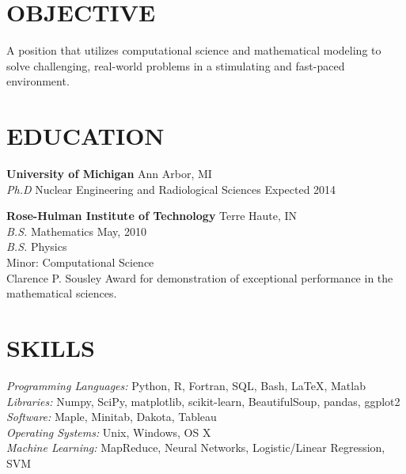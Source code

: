 \documentclass[margin, 10pt]{res} %
\begin{document}
\begin{resume}

 
\section{OBJECTIVE}  

A position that utilizes computational science and mathematical modeling to solve challenging, real-world problems in a stimulating and fast-paced environment.    


\section{EDUCATION}

\textbf{University of Michigan} \hfill Ann Arbor, MI \\
{\sl Ph.D} Nuclear Engineering and Radiological Sciences \hfill Expected 2014

\textbf{Rose-Hulman Institute of Technology} \hfill Terre Haute, IN \\
{\sl B.S.} Mathematics \hfill May, 2010 \\
{\sl B.S.} Physics \\
Minor: Computational Science \\
Clarence P. Sousley Award for demonstration of exceptional performance in the mathematical sciences.
 

\section{SKILLS} 

{\sl Programming Languages:} Python, R, Fortran, SQL, Bash, \LaTeX, Matlab \\
{\sl Libraries:} Numpy, SciPy, matplotlib, scikit-learn, BeautifulSoup, pandas, ggplot2 \\
{\sl Software:} Maple, Minitab, Dakota, Tableau \\
{\sl Operating Systems:} Unix, Windows, OS X \\
{\sl Machine Learning:} MapReduce, Neural Networks, Logistic/Linear Regression, SVM
 

\end{resume}
\end{document}
